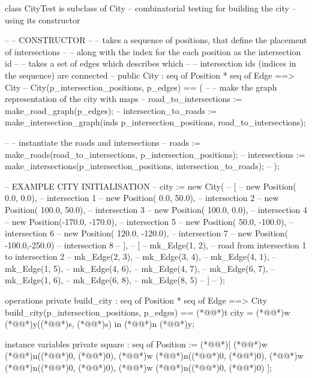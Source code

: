\documentclass[a4paper]{article}
\begin{document}
\title{}
\author{}
\begin{vdm_al}
class CityTest is subclass of City
-- combinatorial testing for building the city
-- using its constructor

-- -- CONSTRUCTOR
-- -- takes a sequence of positions, that define the placement of intersections
-- -- along with the index for the each position as the intersection id
-- -- takes a set of edges which describes which
-- -- intersection ids (indices in the sequence) are connected
-- public City : seq of Position * seq of Edge ==> City
-- City(p_intersection_positions, p_edges) == (
--     -- make the graph representation of the city with maps
--     road_to_intersections := make_road_graph(p_edges);
--     intersection_to_roads := make_intersection_graph(inds p_intersection_positions, road_to_intersections);
    
--     -- instantiate the roads and intersections
--     roads := make_roads(road_to_intersections, p_intersection_positions);
--     intersections := make_intersections(p_intersection_positions, intersection_to_roads);
-- );

-- EXAMPLE CITY INITIALISATION
-- city := new City(
--     [
--         new Position(   0.0,    0.0), -- intersection 1
--         new Position(   0.0,   50.0), -- intersection 2
--         new Position( 100.0,   50.0), -- intersection 3
--         new Position( 100.0,    0.0), -- intersection 4
--         new Position(-170.0, -170.0), -- intersection 5
--         new Position(  50.0, -100.0), -- intersection 6
--         new Position( 120.0, -120.0), -- intersection 7
--         new Position( -100.0,-250.0)  -- intersection 8
--     ],
--     [
--         mk_Edge(1, 2), -- road from intersection 1 to intersection 2
--         mk_Edge(2, 3),
--         mk_Edge(3, 4),
--         mk_Edge(4, 1),
--         mk_Edge(1, 5),
--         mk_Edge(4, 6),
--         mk_Edge(4, 7),
--         mk_Edge(6, 7),
--         mk_Edge(1, 6),
--         mk_Edge(6, 8),
--         mk_Edge(8, 5)
--     ]
-- );

operations
    private build_city : seq of Position * seq of Edge ==> City
    build_city(p_intersection_positions, p_edges) ==
        (*@@*)t city = (*@@*)w (*@@*)y((*@@*)s, (*@@*)s) in (*@@*)n (*@@*)y;

instance variables
    private square : seq of Position := (*@\vdmnotcovered{}@*)[
        (*@@*)w (*@@*)n((*@@*)0, (*@@*)0),
        (*@@*)w (*@@*)n((*@@*)0, (*@@*)0),
        (*@@*)w (*@@*)n((*@@*)0, (*@@*)0),
        (*@@*)w (*@@*)n((*@@*)0, (*@@*)0)
    ];


\end{vdm_al}
\end{document}
